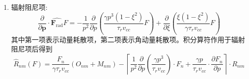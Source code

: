 \begin{enumerate}
\begin{equation}
\end{equation}
其中
\begin{align}
C_{n m}^{1}  & = \frac{2 m+1}{2} \int_{-1}^{1} d \xi P_{m}(\xi) \frac{\partial}{\partial \xi}\left(1-\xi^{2}\right) \frac{\partial}{\partial \xi} P_{n}(\xi)  \label{eq:Cnm1}\\
C_{n m}^{2}  & = \frac{2 m+1}{2} \int_{-1}^{1} d \xi P_{m}(\xi) P_{n}(\xi)
\end{align}
Pike模型中$ν_D^{ee}$，$ν_D^{ei}$，$ν_S^{ee}$以及$ν_∥^{ee}$可参考式\eqref{eq:charnude}，
这里提供另一种简化形式的碰撞项\cite{RN814}
\begin{equation}\label{eq:Collissimp}
\begin{aligned}
\hat{C}[F]=&-k_{e c}  \frac{3 \sqrt{\pi}}{4} \frac{1}{p^{2}} \frac{\partial}{\partial p} p^{2}\left[\delta^{2} \frac{\Psi(x)}{x} \frac{\partial F}{\partial p}+2 \delta \Psi(x) F\right] \\
&-\frac{3 \sqrt{\pi}}{4} \frac{\delta^{2} k_{e c}}{2 x p^{2}}\left[Z+\phi(x)-\Psi(x)+\frac{\delta^{4} x^{2}}{2}\right] \frac{\partial}{\partial \xi}\left(1-\xi^{2}\right) \frac{\partial F}{\partial \xi}
\end{aligned}
\end{equation}
其中 $ \delta=\frac{v_{\mathrm{e}}}{c}$, $x=\frac{p}{\sqrt{1+p^{2} \delta}}$, $k_{e c}=\frac{v_{e e}}{v_{c c}}$, $\Psi(x) $ 是钱德拉塞卡函数,$\Psi(x)=\frac{1}{2 x^{2}}\left[\phi(x)-x \frac{d \phi}{d x}\right]$,  $\mathrm{Z} $ 是有效电荷 数, $ \phi(x)  $是误差函数,$\phi(x) =2pi^{-1/2}\int_0^x\exp{-s^2}\dif s$, $ v_{e}=\sqrt{\frac{2 T}{m_{e}}}, \quad v_{c c}=\frac{n_{e} e^{4} l n \Lambda}{4 \pi \varepsilon_{0}^{2} m_{e}^{2} c^{3}}, \quad v_{e e}=\frac{n_{e} e^{4} \ln \Lambda}{4 \pi \varepsilon_{0}^{2} m_{e}^{2} v_{e}^{3}} $。Landreman曾用此碰撞项对电子同步辐射展开过分析\cite{RN814}，该方程相对Pike模型具有更简洁的表达形式，在计算中可以避免很多微分处理引入的麻烦。
\item
辐射阻尼项:
\begin{equation}
\frac{\partial}{\partial \boldsymbol{p}} \cdot \widehat{ \boldsymbol{F}_{\mathrm{rad}} }F=-\frac{1}{p^{2}} \frac{\partial}{\partial p}\left(\frac{\gamma p^{3}\left(1-\xi^{2}\right)}{\tau_{r} v_{c c}} F\right)+\frac{\partial}{\partial \xi}\left(\frac{\xi\left(1-\xi^{2}\right)}{\gamma \tau_{r} v_{c c}} F\right)
\end{equation}
其中第一项表示动量耗散项，第二项表示角动量耗散项。积分算符作用于辐射阻尼项后得到
\begin{equation}
\hat{R}_{n m}(F)=\frac{F_{n}}{\gamma \tau_{r} v_{c c}}\left(O_{n m}+M_{n m}\right)-\left\lceil\frac{1}{p^{2}} \frac{\partial}{\partial p}\left(\frac{\gamma p^{3}}{\tau_{r} v_{c c}}\right) \cdot F_{n}+\frac{\gamma p}{\tau_{r} v_{c c}} \cdot \frac{\partial F_{n}}{\partial p}\right\rceil \cdot R_{n m}

\end{equation}
\end{enumerate}
